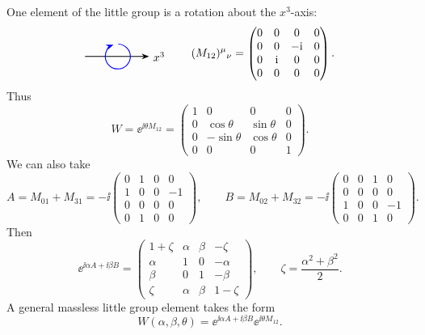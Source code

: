 One element of the little group is a rotation about the \(x^3\)-axis:
\[
\begin{tikzpicture}[baseline=(axis.base),>=Stealth,scale=0.85]
  \coordinate (axis) at (0,0);
  \draw[->,thick] (-1.0,0) -- (1.35,0) node[right] {$x^3$};
  \draw[blue,thick,->] (0.22,0.46) arc[start angle=88,end angle=-250,radius=0.46];
\end{tikzpicture}
\qquad
  (M_{12})^\mu{}_\nu
  =
  \begin{pmatrix}
    0&0&0&0\\
    0&0&-\ii&0\\
    0&\ii&0&0\\
    0&0&0&0
  \end{pmatrix}.
\]
Thus
\[
  W=\ee^{\ii\theta M_{12}}
  =
  \begin{pmatrix}
    1&0&0&0\\
    0&\cos\theta&\sin\theta&0\\
    0&-\sin\theta&\cos\theta&0\\
    0&0&0&1
  \end{pmatrix}.
\]
We can also take
\[
  A=M_{01}+M_{31}
  =
  -\ii
  \begin{pmatrix}
    0&1&0&0\\
    1&0&0&-1\\
    0&0&0&0\\
    0&1&0&0
  \end{pmatrix},
  \qquad
  B=M_{02}+M_{32}
  =
  -\ii
  \begin{pmatrix}
    0&0&1&0\\
    0&0&0&0\\
    1&0&0&-1\\
    0&0&1&0
  \end{pmatrix}.
\]
Then
\[
  \ee^{\ii\alpha A+\ii\beta B}
  =
  \begin{pmatrix}
    1+\zeta&\alpha&\beta&-\zeta\\
    \alpha&1&0&-\alpha\\
    \beta&0&1&-\beta\\
    \zeta&\alpha&\beta&1-\zeta
  \end{pmatrix},
  \qquad
  \zeta=\frac{\alpha^2+\beta^2}{2}.
\]
A general massless little group element takes the form
\[
  W(\alpha,\beta,\theta)
  =
  \ee^{\ii\alpha A+\ii\beta B}\ee^{\ii\theta M_{12}}.
\]

